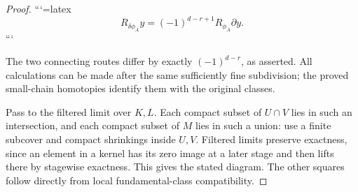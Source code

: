 \begin{proof}
```{=latex}
\[
R_{\delta\phi_A}y=(-1)^{d-r+1}R_{\phi_A}\partial y.
\]
```


The two connecting routes differ by exactly \((-1)^{d-r}\), as asserted. All calculations can be made after the same sufficiently fine subdivision; the proved small-chain homotopies identify them with the original classes.

Pass to the filtered limit over \(K,L\). Each compact subset of \(U\cap V\) lies in such an intersection, and each compact subset of \(M\) lies in such a union: use a finite subcover and compact shrinkings inside \(U,V\). Filtered limits preserve exactness, since an element in a kernel has its zero image at a later stage and then lifts there by stagewise exactness. This gives the stated diagram. The other squares follow directly from local fundamental-class compatibility.
\end{proof}

\label{courseIII:duality:2.2}

